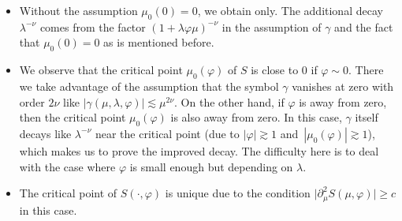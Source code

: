 \documentclass[10pt,a4paper]{amsart}
\numberwithin{equation}{section}
\def\c{\gamma}
\def\f{\varphi}
\def\l{\lambda}
\def\m{\mu}
\def\n{\nu}
\def\pa{\partial}
\begin{document}
\begin{Remark}\quad
\begin{itemize}\itemsep=0pt
\item[(1)] Without the assumption $\m_0(0)=0$, we obtain \smash{$I(\l,\f)\lesssim \l^{-\frac{1}{2}}$} only. The additional decay~$\l^{-\n}$ comes from the factor $(1+\l \f\m)^{-\n}$ in the assumption of $\c$ and the fact that $\m_0(0)=0$ as is mentioned before.

\item[(2)] We observe that the critical point $\m_0(\f)$ of $S$ is close to $0$ if $\f\sim 0$. There we take advantage of the assumption that the symbol $\c$ vanishes at zero with order $2\n$ like $|\c(\m,\l,\f)|\lesssim \m^{2\n}$. On the other hand, if $\f$ is away from zero, then the critical point $\m_0(\f)$ is also away from zero. In this case, $\c$ itself decays like $\l^{-\n}$ near the critical point (due to $|\f|\gtrsim 1$ and~${|\m_0(\f)|\gtrsim 1}$), which makes us to prove the improved decay. The difficulty here is to deal with the case where $\f$ is small enough but depending on $\l$.

\item[(3)]
The critical point of $S(\cdot,\f)$ is unique due to the condition $\big|\pa_{\m}^2S(\m,\f)\big|\geq c$ in this case.
\end{itemize}
\end{Remark}
\end{document}
